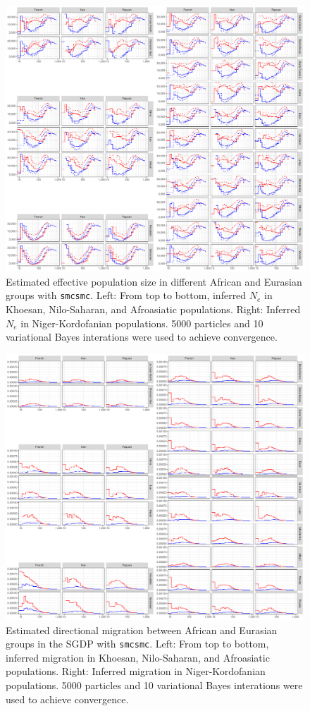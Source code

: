 \documentclass{article}
\begin{document}
\begin{figure}
	\centering
	\includegraphics[width=0.75\linewidth]{../plot/sgdp_ne.pdf}
	\caption{Estimated effective population size in different African and Eurasian groups with {\tt smcsmc}. Left: From top to bottom, inferred $N_e$ in Khoesan, Nilo-Saharan, and Afroasiatic populations. Right: Inferred $N_e$ in Niger-Kordofanian populations. 5000 particles and 10 variational Bayes interations were used to achieve convergence.}	
	\label{sgdp_ne}
\end{figure}

\begin{figure}
	\centering
	\includegraphics[width=0.75\linewidth]{../plot/sgdp_mig.pdf}
	\caption{Estimated directional migration between African and Eurasian groups in the SGDP with {\tt smcsmc}. Left: From top to bottom, inferred migration in Khoesan, Nilo-Saharan, and Afroasiatic populations. Right: Inferred migration in Niger-Kordofanian populations. 5000 particles and 10 variational Bayes interations were used to achieve convergence.}	
	\label{sgdp_mig}
\end{figure}
\end{document}

